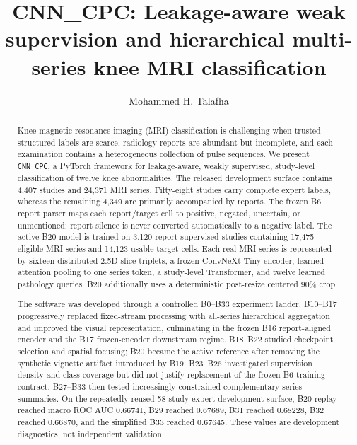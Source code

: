 \documentclass[preprint,12pt]{elsarticle}
\newcommand{\code}[1]{\texttt{#1}}
\begin{document}
\begin{frontmatter}

\title{CNN\_CPC: Leakage-aware weak supervision and hierarchical multi-series knee MRI classification}

\author[a]{Mohammed H. Talafha}
\address[a]{Research Institute of Sciences and Engineering, University of Sharjah, Sharjah, United Arab Emirates}

\begin{abstract}
Knee magnetic-resonance imaging (MRI) classification is challenging when trusted structured labels are scarce, radiology reports are abundant but incomplete, and each examination contains a heterogeneous collection of pulse sequences. We present \code{CNN\_CPC}, a PyTorch framework for leakage-aware, weakly supervised, study-level classification of twelve knee abnormalities. The released development surface contains 4,407 studies and 24,371 MRI series. Fifty-eight studies carry complete expert labels, whereas the remaining 4,349 are primarily accompanied by reports. The frozen B6 report parser maps each report/target cell to positive, negated, uncertain, or unmentioned; report silence is never converted automatically to a negative label. The active B20 model is trained on 3,120 report-supervised studies containing 17,475 eligible MRI series and 14,123 usable target cells. Each real MRI series is represented by sixteen distributed 2.5D slice triplets, a frozen ConvNeXt-Tiny encoder, learned attention pooling to one series token, a study-level Transformer, and twelve learned pathology queries. B20 additionally uses a deterministic post-resize centered 90\% crop.

The software was developed through a controlled B0--B33 experiment ladder. B10--B17 progressively replaced fixed-stream processing with all-series hierarchical aggregation and improved the visual representation, culminating in the frozen B16 report-aligned encoder and the B17 frozen-encoder downstream regime. B18--B22 studied checkpoint selection and spatial focusing; B20 became the active reference after removing the synthetic vignette artifact introduced by B19. B23--B26 investigated supervision density and class coverage but did not justify replacement of the frozen B6 training contract. B27--B33 then tested increasingly constrained complementary series summaries. On the repeatedly reused 58-study expert development surface, B20 replay reached macro ROC AUC 0.66741, B29 reached 0.67689, B31 reached 0.68228, B32 reached 0.66870, and the simplified B33 reached 0.67645. These values are development diagnostics, not independent validation.


\end{abstract}
\end{frontmatter}
\end{document}

